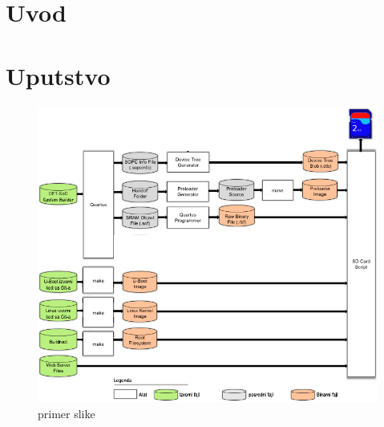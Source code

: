 \documentclass[12pt, a4paper]{article}
\begin{document}



\section{Uvod}


\pagebreak
\section{Uputstvo}




\begin{figure}[h!]
\centering
\includegraphics[scale=1.]{img/gsrd-flow.png}
\caption{primer slike}
\label{slika1:hw}
\end{figure}
\end{document}
